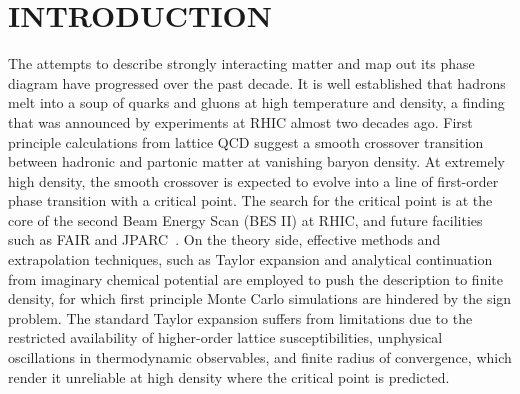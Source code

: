 \documentclass[%
 reprint,
nofootinbib,
 amsmath,amssymb,
 aps,
prc
]{revtex4-2}
\begin{document}
\section{\label{Introduction }INTRODUCTION\protect\\ }

The attempts to describe strongly interacting matter and map out its phase diagram have progressed over the past decade. It is well established that hadrons melt into a soup of quarks and gluons at high temperature and density, a finding that was announced by experiments at RHIC \cite{STAR:2005gfr,PHENIX:2004vcz,PHOBOS:2004zne,BRAHMS:2004adc} almost two decades ago. First principle calculations from lattice QCD \cite{Aoki:2006we,Cheng:2006qk,Bhattacharya:2014ara} suggest a smooth crossover transition between hadronic and partonic matter at vanishing baryon density. At extremely high density, the smooth crossover is expected to evolve into a line of first-order phase transition with a critical point. The search for the critical point is at the core of the second Beam Energy Scan (BES II) at RHIC, and future facilities such as FAIR and JPARC~\cite{CBM:2016kpk,Durante:2019hzd,Fukushima:2020yzx}. On the theory side, effective methods and extrapolation techniques, such as Taylor expansion \cite{Gavai:2003mf,Guenther:2017hnx,HotQCD:2018pds,Borsanyi:2022soo,Bollweg:2022fqq,Bollweg:2022rps} and analytical continuation from
imaginary chemical potential \cite{Bellwied:2015rza,Borsanyi:2020fev} 
are employed to push the description to finite density, for which first principle Monte Carlo simulations are hindered by the sign problem.  
The standard Taylor expansion suffers from limitations due to the restricted availability of higher-order lattice susceptibilities, unphysical oscillations in thermodynamic observables, and finite radius of convergence, which render it unreliable at high density where the critical point is predicted. 
\end{document}

